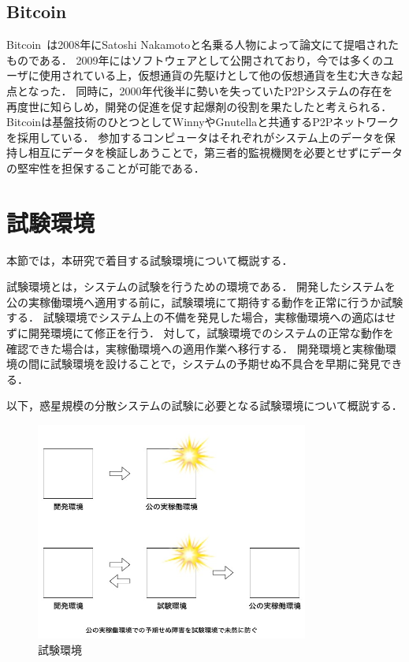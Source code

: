\subsection{Bitcoin}

Bitcoin~\cite{Bitcoin}は2008年にSatoshi Nakamotoと名乗る人物によって論文にて提唱されたものである．
2009年にはソフトウェアとして公開されており，今では多くのユーザに使用されている上，仮想通貨の先駆けとして他の仮想通貨を生む大きな起点となった．
同時に，2000年代後半に勢いを失っていたP2Pシステムの存在を再度世に知らしめ，開発の促進を促す起爆剤の役割を果たしたと考えられる．
Bitcoinは基盤技術のひとつとしてWinnyやGnutellaと共通するP2Pネットワークを採用している．
参加するコンピュータはそれぞれがシステム上のデータを保持し相互にデータを検証しあうことで，第三者的監視機関を必要とせずにデータの堅牢性を担保することが可能である．

\section{試験環境}
\label{bg:staging}

本節では，本研究で着目する試験環境について概説する．

試験環境とは，システムの試験を行うための環境である．
開発したシステムを公の実稼働環境へ適用する前に，試験環境にて期待する動作を正常に行うか試験する．
試験環境でシステム上の不備を発見した場合，実稼働環境への適応はせずに開発環境にて修正を行う．
対して，試験環境でのシステムの正常な動作を確認できた場合は，実稼働環境への適用作業へ移行する．
開発環境と実稼働環境の間に試験環境を設けることで，システムの予期せぬ不具合を早期に発見できる．

以下，惑星規模の分散システムの試験に必要となる試験環境について概説する．

\begin{figure}[htbp]
  \begin{center}
    \includegraphics[width=0.8\textwidth]{./figures/staging.jpg}
    \caption{試験環境}
  \end{center}
\end{figure}

